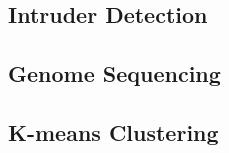 \subsection{Intruder Detection}
\label{sec:experiments:intruder}

\subsection{Genome Sequencing}
\label{sec:experiments:genome}




\subsection{K-means Clustering}
\label{sec:experiments:kmeans}








